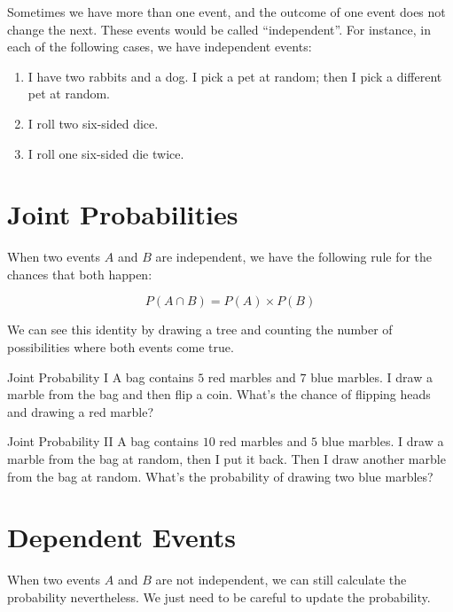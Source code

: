 \documentclass[a4paper,10pt]{report}
\begin{document}
Sometimes we have more than one event, and the outcome of one event does not
change the next. These events would be called ``independent''. For instance,
in each of the following cases, we have independent events:

\begin{enumerate}
 \item I have two rabbits and a dog. I pick a pet at random; then I pick a
 different pet at random.
 \item I roll two six-sided dice.
 \item I roll one six-sided die twice.
\end{enumerate}

\section{Joint Probabilities}

When two events $A$ and $B$ are independent, we have the following rule for the
chances that both happen:

\begin{equation}
 P(A \cap B) = P(A) \times P(B)
\end{equation}

We can see this identity by drawing a tree and counting the number of
possibilities where both events come true.

\begin{problem}{Joint Probability I}
 A bag contains $5$ red marbles and $7$ blue marbles. I draw a marble from the
 bag and then flip a coin. What's the chance of flipping heads and drawing a red
 marble?
\end{problem}

\begin{problem}{Joint Probability II}
 A bag contains $10$ red marbles and $5$ blue marbles. I draw a marble from the
 bag at random, then I put it back. Then I draw another marble from the bag at
 random. What's the probability of drawing two blue marbles?
\end{problem}

\section{Dependent Events}

When two events $A$ and $B$ are not independent, we can still calculate the
probability nevertheless. We just need to be careful to update the probability.
\end{document}
